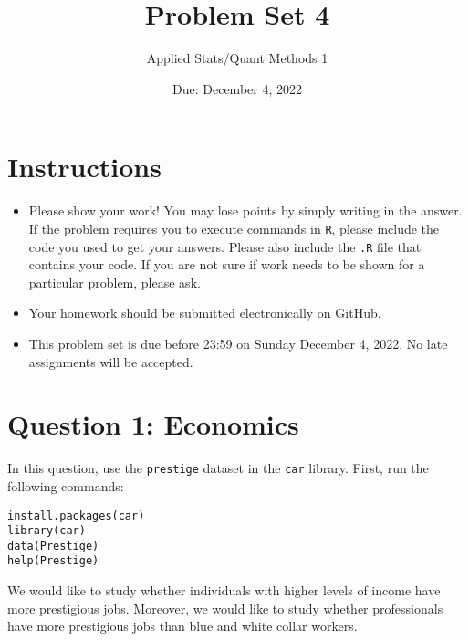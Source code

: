 \documentclass[12pt,letterpaper]{article}
\title{Problem Set 4}
\date{Due: December 4, 2022}
\author{Applied Stats/Quant Methods 1}
\begin{document}
\maketitle

\section*{Instructions}

	\begin{itemize}
		\item Please show your work! You may lose points by simply writing in the answer. If the problem requires you to execute commands in \texttt{R}, please include the code you used to get your answers. Please also include the \texttt{.R} file that contains your code. If you are not sure if work needs to be shown for a particular problem, please ask.

		\item Your homework should be submitted electronically on GitHub.

		\item This problem set is due before 23:59 on Sunday December 4, 2022. No late assignments will be accepted.
	\end{itemize}

	\vspace{.5cm}

\section*{Question 1: Economics}
\vspace{.25cm}
\noindent 	
In this question, use the \texttt{prestige} dataset in the \texttt{car} library. First, run the following commands:

\begin{verbatim}
install.packages(car)
library(car)
data(Prestige)
help(Prestige)
\end{verbatim} 

\noindent We would like to study whether individuals with higher levels of income have more prestigious jobs. Moreover, we would like to study whether professionals have more prestigious jobs than blue and white collar workers.

\newpage
\end{document}
